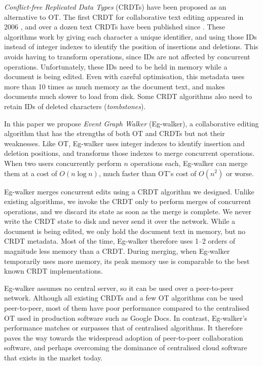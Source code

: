 \documentclass[sigplan,10pt]{acmart}
\newcommand{\algname}{Eg-walker\xspace}
\begin{document}
\emph{Conflict-free Replicated Data Types} (CRDTs) have been proposed as an alternative to OT.
The first CRDT for collaborative text editing appeared in 2006 \cite{Oster2006WOOT}, and over a dozen text CRDTs have been published since \cite{crdt-papers}.
These algorithms work by giving each character a unique identifier, and using those IDs instead of integer indexes to identify the position of insertions and deletions.
This avoids having to transform operations, since IDs are not affected by concurrent operations.
Unfortunately, these IDs need to be held in memory while a document is being edited.
Even with careful optimisation, this metadata uses more than 10 times as much memory as the document text, and makes documents much slower to load from disk.
Some CRDT algorithms also need to retain IDs of deleted characters (\emph{tombstones}).

In this paper we propose \emph{Event Graph Walker} (\algname), a collaborative editing algorithm that has the strengths of both OT and CRDTs but not their weaknesses.
Like OT, \algname uses integer indexes to identify insertion and deletion positions, and transforms those indexes to merge concurrent operations.
When two users concurrently perform $n$ operations each, \algname can merge them at a cost of $O(n \log n)$, much faster than OT's cost of $O(n^2)$ or worse.

\algname merges concurrent edits using a CRDT algorithm we designed.
Unlike existing algorithms, we invoke the CRDT only to perform merges of concurrent operations, and we discard its state as soon as the merge is complete.
We never write the CRDT state to disk and never send it over the network.
While a document is being edited, we only hold the document text in memory, but no CRDT metadata.
Most of the time, \algname therefore uses 1–2 orders of magnitude less memory than a CRDT.
During merging, when \algname temporarily uses more memory, its peak memory use is comparable to the best known CRDT implementations.

\algname assumes no central server, so it can be used over a peer-to-peer network.
Although all existing CRDTs and a few OT algorithms can be used peer-to-peer, most of them have poor performance compared to the centralised OT used in production software such as Google Docs.
In contrast, \algname's performance matches or surpasses that of centralised algorithms.
It therefore paves the way towards the widespread adoption of peer-to-peer collaboration software, and perhaps overcoming the dominance of centralised cloud software that exists in the market today.
\end{document}
